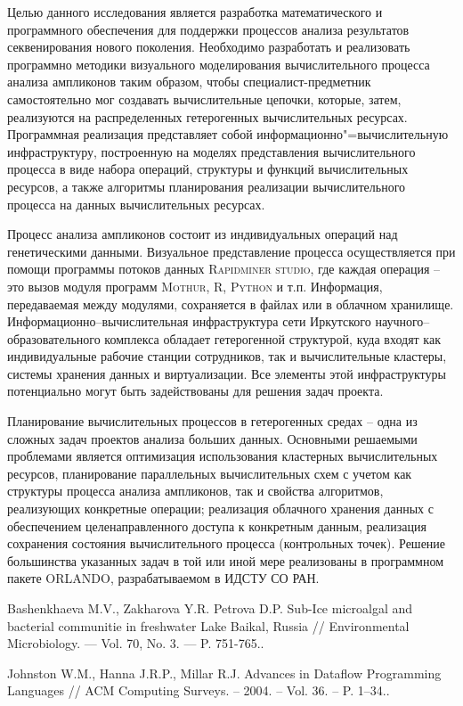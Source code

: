 \documentclass[12pt]{llncs}
\begin{document}
Целью данного исследования является разработка математического и программного обеспечения для поддержки процессов анализа результатов секвенирования нового поколения.  Необходимо разработать и реализовать программно методики визуального моделирования вычислительного процесса анализа ампликонов таким образом, чтобы специалист-предметник самостоятельно мог создавать вычислительные цепочки, которые, затем, реализуются на распределенных гетерогенных вычислительных ресурсах.  Программная реализация представляет собой информационно"=вычислительную инфраструктуру, построенную на моделях представления вычислительного процесса в виде набора операций, структуры и функций вычислительных ресурсов, а также алгоритмы планирования реализации вычислительного процесса на данных вычислительных ресурсах.

Процесс анализа ампликонов состоит из индивидуальных операций над генетическими данными.  Визуальное представление процесса осуществляется при помощи программы потоков данных \cite{dataflow} \textsc{Rapidminer studio}, где каждая операция -- это вызов модуля программ \textsc{Mothur}, \textsc{R}, \textsc{Python} и т.п.  Информация, передаваемая между модулями, сохраняется в файлах или в облачном хранилище.  Информационно--вычислительная инфраструктура сети Иркутского научного--образовательного комплекса обладает гетерогенной структурой, куда входят как индивидуальные рабочие станции сотрудников, так и вычислительные кластеры, системы хранения данных и виртуализации.  Все элементы этой инфраструктуры потенциально могут быть задействованы для решения задач проекта.

Планирование вычислительных процессов в гетерогенных средах -- одна из сложных задач проектов анализа больших данных.  Основными решаемыми проблемами является оптимизация использования кластерных вычислительных ресурсов, планирование параллельных вычислительных схем с учетом как структуры процесса анализа ампликонов, так и свойства алгоритмов, реализующих конкретные операции; реализация облачного хранения данных с обеспечением целенаправленного доступа к конкретным данным, реализация сохранения состояния вычислительного процесса (контрольных точек).  Решение большинства указанных задач в той или иной мере реализованы в программном пакете ORLANDO, разрабатываемом в ИДСТУ СО РАН.


\begin{thebibliography}{9}
 Bashenkhaeva M.V., Zakharova Y.R. Petrova D.P. Sub-Ice microalgal and bacterial communitie in freshwater Lake Baikal, Russia // Environmental Microbiology. — Vol. 70, No. 3. — P. 751-765..

 Johnston W.M., Hanna J.R.P., Millar R.J. Advances in Dataflow Programming Languages // ACM Computing Surveys. – 2004. – Vol. 36. – P. 1–34..


\end{thebibliography}
\end{document}
